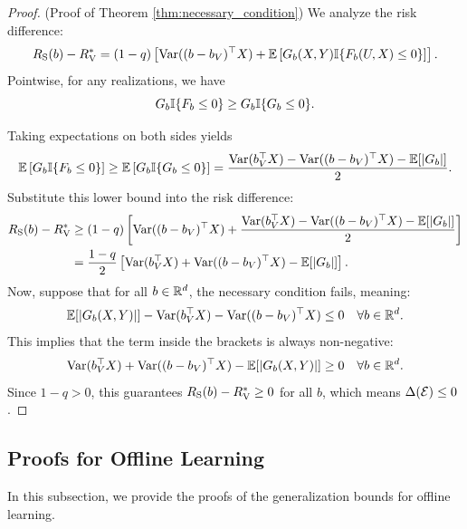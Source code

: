 \begin{proof}(Proof of Theorem \ref{thm:necessary_condition})\label{proof:necessary_condition}\label{app:proof_necessary_condition}
We analyze the risk difference:
\begin{equation*}
    R_{\mathrm{S}}(b) - R_{\mathrm{V}}^* = (1 - q) \left[ \mathrm{Var}((b - b_V)^\top X) + \mathbb{E}\left[ G_b(X, Y) \mathbb{I}\{F_b(U, X) \le 0\} \right] \right].
\end{equation*}
Pointwise, for any realizations, we have
\begin{equation*}
    G_b \mathbb{I}\{F_b \le 0\} \ge G_b \mathbb{I}\{G_b \le 0\}.
\end{equation*}

Taking expectations on both sides yields
\begin{equation*}
    \mathbb{E}\left[ G_b \mathbb{I}\{F_b \le 0\} \right] \ge \mathbb{E}\left[ G_b \mathbb{I}\{G_b \le 0\} \right] = \frac{\mathrm{Var}(b_V^\top X) - \mathrm{Var}((b - b_V)^\top X) - \mathbb{E}[|G_b|]}{2}.
\end{equation*}
Substitute this lower bound into the risk difference:
\begin{align*}
    R_{\mathrm{S}}(b) - R_{\mathrm{V}}^* &\ge (1 - q) \left[ \mathrm{Var}((b - b_V)^\top X) + \frac{\mathrm{Var}(b_V^\top X) - \mathrm{Var}((b - b_V)^\top X) - \mathbb{E}[|G_b|]}{2} \right] \nonumber \\
    &= \frac{1 - q}{2} \left[ \mathrm{Var}(b_V^\top X) + \mathrm{Var}((b - b_V)^\top X) - \mathbb{E}[|G_b|] \right].
\end{align*}
Now, suppose that for all $b \in \mathbb{R}^d$, the necessary condition fails, meaning:
\begin{equation*}
    \mathbb{E}[|G_b(X, Y)|] - \mathrm{Var}(b_V^\top X) - \mathrm{Var}((b - b_V)^\top X) \le 0 \quad \forall b \in \mathbb{R}^d.
\end{equation*}
This implies that the term inside the brackets is always non-negative:
\begin{equation*}
    \mathrm{Var}(b_V^\top X) + \mathrm{Var}((b - b_V)^\top X) - \mathbb{E}[|G_b(X, Y)|] \ge 0 \quad \forall b \in \mathbb{R}^d.
\end{equation*}
Since $1 - q > 0$, this guarantees $R_{\mathrm{S}}(b) - R_{\mathrm{V}}^* \ge 0$ for all $b$, which means $\Delta(\mathcal{E}) \le 0$.
\end{proof}


\subsection{Proofs for Offline Learning}

In this subsection, we provide the proofs of the generalization bounds for offline learning.

